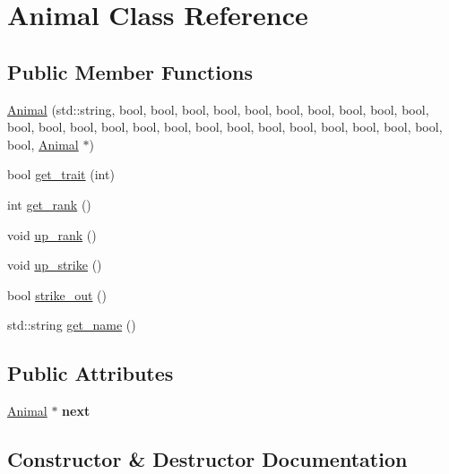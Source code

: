 \hypertarget{class_animal}{}\section{Animal Class Reference}
\label{class_animal}
\subsection*{Public Member Functions}
\begin{DoxyCompactItemize}
\item 
\hyperlink{class_animal_aa859957081b27fec588c835d58346219}{Animal} (std\+::string, bool, bool, bool, bool, bool, bool, bool, bool, bool, bool, bool, bool, bool, bool, bool, bool, bool, bool, bool, bool, bool, bool, bool, bool, bool, \hyperlink{class_animal}{Animal} $\ast$)
\item 
bool \hyperlink{class_animal_a8770b1e9d676aaffc8c0775a2c8abcc3}{get\+\_\+trait} (int)
\item 
int \hyperlink{class_animal_a5a89d42b3f5c22688f928f5555e525e7}{get\+\_\+rank} ()
\item 
void \hyperlink{class_animal_a4327225dabf6be8068e8dc5e99d3405e}{up\+\_\+rank} ()
\item 
void \hyperlink{class_animal_a5afad0e691cac7d3c8999511622127ca}{up\+\_\+strike} ()
\item 
bool \hyperlink{class_animal_a028b54789fe5bfb5afdca40bf715ae45}{strike\+\_\+out} ()
\item 
std\+::string \hyperlink{class_animal_a2bac6b03c0926d293be3dcfeb4fabed2}{get\+\_\+name} ()
\end{DoxyCompactItemize}
\subsection*{Public Attributes}
\begin{DoxyCompactItemize}
\item 
\hypertarget{class_animal_a46113b759bddd1c61bf3466ece75571c}{}\hyperlink{class_animal}{Animal} $\ast$ {\bfseries next}\label{class_animal_a46113b759bddd1c61bf3466ece75571c}

\end{DoxyCompactItemize}


\subsection{Constructor \& Destructor Documentation}
\hypertarget{class_animal_aa859957081b27fec588c835d58346219}{}
